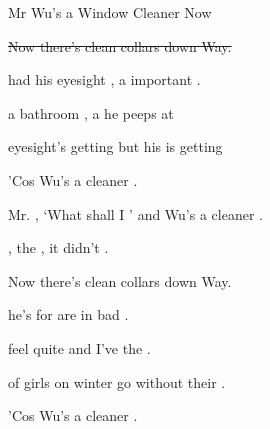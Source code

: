 \begin{SBSong}{Mr Wu's a Window Cleaner Now}
\begin{SBChorus}
	\sout{Now there's  clean collars down  Way.}
  \end{SBChorus}
  \begin{SBVerse}
	 had his eyesight , a  important .
	
	 a bathroom , a  he peeps at 
	
	 eyesight's getting  but his  is getting 
	
	'Cos  Wu's a  cleaner .
  \end{SBVerse}
  \CBPageBrk
  \begin{SBChorus}
	 Mr. , `What shall I ' and  Wu's a  cleaner .
	
	, the , it didn't .
	
	Now there's  clean collars down  Way.
  \end{SBChorus}
  \begin{SBVerse}
	 he's  for  are in bad .
	
	 feel quite  and I've  the .
	
	 of girls on winter  go  without their .
	
	'Cos  Wu's a  cleaner .
  \end{SBVerse}
\end{SBSong}